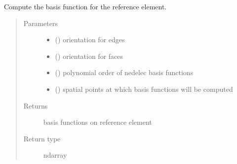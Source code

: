 \documentclass[letterpaper,10pt,english]{sphinxmanual}
\begin{document}

\begin{fulllineitems}
\label{\detokenize{petgem/hvfem:petgem.hvfem.computeBasisFunctionsReferenceElement}}
Compute the basis function for the reference element.
\begin{quote}\begin{description}
\item[{Parameters}] \leavevmode\begin{itemize}
\item {} 
 () \textendash{} orientation for edges

\item {} 
 () \textendash{} orientation for faces

\item {} 
 () \textendash{} polynomial order of nedelec basis functions

\item {} 
 () \textendash{} spatial points at which basis functions will be computed

\end{itemize}

\item[{Returns}] \leavevmode
basis functions on reference element

\item[{Return type}] \leavevmode
ndarray

\end{description}\end{quote}

\end{fulllineitems}

\end{document}
